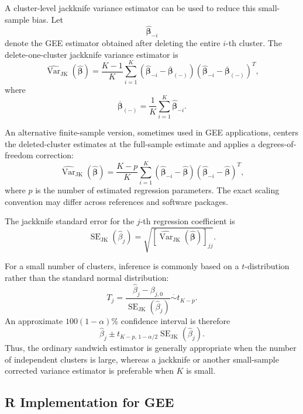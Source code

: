 \documentclass[11pt]{article}
\theoremstyle{definition}
\begin{document}
A cluster-level jackknife variance estimator can be used to reduce this
small-sample bias. Let
\[
\widehat{\boldsymbol{\beta}}_{-i}
\]
denote the GEE estimator obtained after deleting the entire \(i\)-th cluster.
The delete-one-cluster jackknife variance estimator is
\[
\widehat{\operatorname{Var}}_{\mathrm{JK}}
\left(
\widehat{\boldsymbol{\beta}}
\right)
=
\frac{K-1}{K}
\sum_{i=1}^{K}
\left(
\widehat{\boldsymbol{\beta}}_{-i}
-
\overline{\boldsymbol{\beta}}_{(-)}
\right)
\left(
\widehat{\boldsymbol{\beta}}_{-i}
-
\overline{\boldsymbol{\beta}}_{(-)}
\right)^{T},
\]
where
\[
\overline{\boldsymbol{\beta}}_{(-)}
=
\frac{1}{K}
\sum_{i=1}^{K}
\widehat{\boldsymbol{\beta}}_{-i}.
\]

An alternative finite-sample version, sometimes used in GEE applications,
centers the deleted-cluster estimates at the full-sample estimate and applies
a degrees-of-freedom correction:
\[
\widehat{\operatorname{Var}}_{\mathrm{JK}}
\left(
\widehat{\boldsymbol{\beta}}
\right)
=
\frac{K-p}{K}
\sum_{i=1}^{K}
\left(
\widehat{\boldsymbol{\beta}}_{-i}
-
\widehat{\boldsymbol{\beta}}
\right)
\left(
\widehat{\boldsymbol{\beta}}_{-i}
-
\widehat{\boldsymbol{\beta}}
\right)^{T},
\]
where \(p\) is the number of estimated regression parameters. The exact
scaling convention may differ across references and software packages.

The jackknife standard error for the \(j\)-th regression coefficient is
\[
\operatorname{SE}_{\mathrm{JK}}
\left(
\widehat{\beta}_j
\right)
=
\sqrt{
\left[
\widehat{\operatorname{Var}}_{\mathrm{JK}}
\left(
\widehat{\boldsymbol{\beta}}
\right)
\right]_{jj}
}.
\]

For a small number of clusters, inference is commonly based on a
\(t\)-distribution rather than the standard normal distribution:
\[
T_j
=
\frac{
\widehat{\beta}_j-\beta_{j,0}
}{
\operatorname{SE}_{\mathrm{JK}}
\left(
\widehat{\beta}_j
\right)
}
\overset{\cdot}{\sim}
t_{K-p}.
\]
An approximate \(100(1-\alpha)\%\) confidence interval is therefore
\[
\widehat{\beta}_j
\pm
t_{K-p,\,1-\alpha/2}
\operatorname{SE}_{\mathrm{JK}}
\left(
\widehat{\beta}_j
\right).
\]
Thus, the ordinary sandwich estimator is generally appropriate when the
number of independent clusters is large, whereas a jackknife or another
small-sample corrected variance estimator is preferable when \(K\) is small.

\subsection*{R Implementation for GEE}
\end{document}

